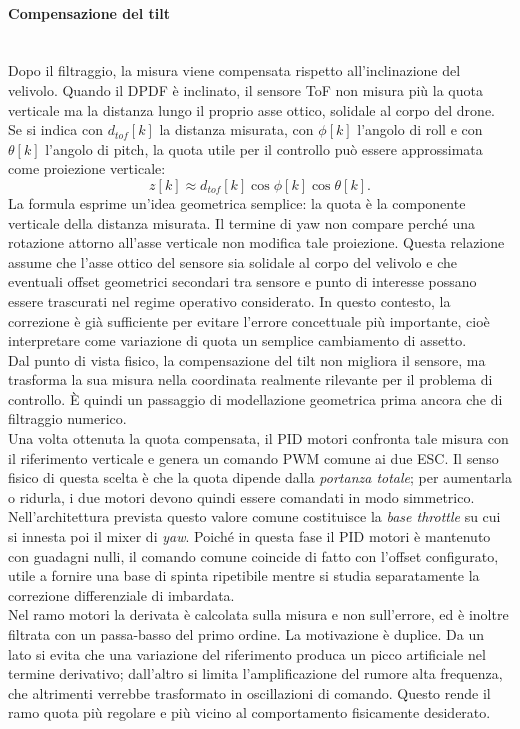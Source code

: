 \documentclass[11pt]{report}
\begin{document}
	\paragraph{Compensazione del tilt}\mbox{}\\
	Dopo il filtraggio, la misura viene compensata rispetto all'inclinazione del velivolo. Quando il DPDF è inclinato, il sensore ToF non misura più la quota verticale ma la distanza lungo il proprio asse ottico, solidale al corpo del drone. Se si indica con $d_{tof}[k]$ la distanza misurata, con $\phi[k]$ l'angolo di roll e con $\theta[k]$ l'angolo di pitch, la quota utile per il controllo può essere approssimata come proiezione verticale:
	\begin{equation}
		z[k] \approx d_{tof}[k]\cos\phi[k]\cos\theta[k].
	\end{equation}
	La formula esprime un'idea geometrica semplice: la quota è la componente verticale della distanza misurata. Il termine di yaw non compare perché una rotazione attorno all'asse verticale non modifica tale proiezione. Questa relazione assume che l'asse ottico del sensore sia solidale al corpo del velivolo e che eventuali offset geometrici secondari tra sensore e punto di interesse possano essere trascurati nel regime operativo considerato. In questo contesto, la correzione è già sufficiente per evitare l'errore concettuale più importante, cioè interpretare come variazione di quota un semplice cambiamento di assetto.\\
	Dal punto di vista fisico, la compensazione del tilt non migliora il sensore, ma trasforma la sua misura nella coordinata realmente rilevante per il problema di controllo. È quindi un passaggio di modellazione geometrica prima ancora che di filtraggio numerico.\\
	Una volta ottenuta la quota compensata, il PID motori confronta tale misura con il riferimento verticale e genera un comando PWM comune ai due ESC. Il senso fisico di questa scelta è che la quota dipende dalla \textit{portanza totale}; per aumentarla o ridurla, i due motori devono quindi essere comandati in modo simmetrico. Nell'architettura prevista questo valore comune costituisce la \emph{base throttle} su cui si innesta poi il mixer di \textit{yaw}. Poiché in questa fase il PID motori è mantenuto con guadagni nulli, il comando comune coincide di fatto con l'offset configurato, utile a fornire una base di spinta ripetibile mentre si studia separatamente la correzione differenziale di imbardata.\\
	Nel ramo motori la derivata è calcolata sulla misura e non sull'errore, ed è inoltre filtrata con un passa-basso del primo ordine. La motivazione è duplice. Da un lato si evita che una variazione del riferimento produca un picco artificiale nel termine derivativo; dall'altro si limita l'amplificazione del rumore alta frequenza, che altrimenti verrebbe trasformato in oscillazioni di comando. Questo rende il ramo quota più regolare e più vicino al comportamento fisicamente desiderato.\\
\end{document}
